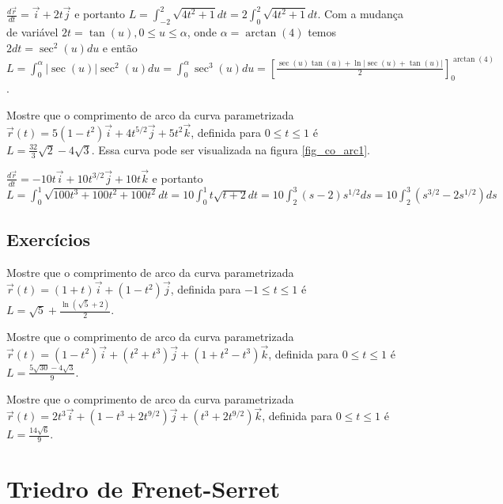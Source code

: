 $\frac{d\vec{r}}{dt} = \vec{i} + 2t \vec{j} $ e portanto $L = \int_{-2}^2 \sqrt{4t^2 + 1} dt = 2 \int_0^2 \sqrt{4t^2+1}dt$. Com a mudança de variável $2t = \tan(u), 0 \leq u \leq \alpha$, onde $\alpha=\arctan(4)$ temos $2dt = \sec^2(u)du$ e então $L =  \int_0^{\alpha} |\sec(u)| \sec^2(u) du = \int_0^{\alpha} \sec^3(u)du = \left[ \frac{\sec(u)\tan(u) + \ln|\sec(u)+\tan(u)|}{2} \right]_0^{\arctan(4)} $.

\begin{exer} \label{exe_co_arc2}
Mostre que o comprimento de arco da curva parametrizada $\vec{r}(t) = 5(1-t^2) \vec{i} + 4 t^{5/2}\vec{j} + 5t^2 \vec{k}$, definida para $0 \leq t \leq 1$ é $ L = \frac{32}{3} \sqrt{2} - 4\sqrt{3}$. Essa curva pode ser visualizada na figura \ref{fig_co_arc1}. 
\end{exer}


$\frac{d\vec{r}}{dt} = -10t \vec{i} + 10 t^{3/2} \vec{j} + 10t \vec{k} $ e portanto $L = \int_0^1 \sqrt{ 100 t^3 + 100 t^2 + 100t^2 } dt = 10 \int_0^1 t \sqrt{t+2} dt = 10 \int_2^3 (s-2) s^{1/2} ds = 10 \int_2^3 (s^{3/2}-2s^{1/2})ds$



\subsection*{Exercícios}

\begin{exer} \label{exe_co_arc3}
Mostre que o comprimento de arco da curva parametrizada $\vec{r}(t) = (1+t) \vec{i} + (1-t^2)\vec{j}$, definida para $-1 \leq t \leq 1$ é $ L = \sqrt{5} + \frac{\ln(\sqrt{5}+2)}{2}$.
\end{exer}


\begin{exer} \label{exe_co_arc4}
Mostre que o comprimento de arco da curva parametrizada $\vec{r}(t) = (1-t^2) \vec{i} + (t^2+t^3) \vec{j} + (1+t^2-t^3)\vec{k}$, definida para $0 \leq t \leq 1$ é $ L = \frac{5 \sqrt{30}-4\sqrt{3}}{9} $.
\end{exer}

\begin{exer} \label{exe_co_arc5}
Mostre que o comprimento de arco da curva parametrizada $\vec{r}(t) = 2t^3 \vec{i} + (1-t^3+2t^{9/2}) \vec{j} + (t^3+2t^{9/2})\vec{k}$, definida para $0 \leq t \leq 1$ é $ L = \frac{14\sqrt{6}}{9} $.
\end{exer}



\section{Triedro de Frenet-Serret}

